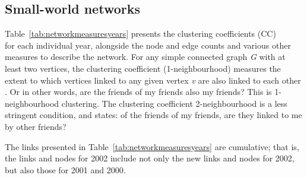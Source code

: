 \documentclass[twocolumn]{svjour3}          %
\theoremstyle{definition}
\begin{document}
\subsection{Small-world networks}\label{sec:smallworld}

Table~\ref{tab:networkmeasuresyears} presents the clustering
coefficients (CC)\\ \citep{WattsStrogatz1998} for each individual
year, alongside the node and edge counts and various other measures to
describe the network. For any simple connected graph \emph{G} with at
least two vertices, the clustering coefficient (1-neighbourhood)
measures the extent to which vertices linked to any given vertex
\emph{v} are also linked to each other \citep{WattsStrogatz1998}. Or
in other words, are the friends of my friends also my friends? This is
1-neighbourhood clustering. The clustering coefficient 2-neighbourhood
is a less stringent condition, and states: of the friends of my
friends, are they linked to me by other friends?

The links presented in Table~\ref{tab:networkmeasuresyears} are
cumulative; that is, the links and nodes for 2002 include not only the
new links and nodes for 2002, but also those for 2001 and 2000.
\end{document}
